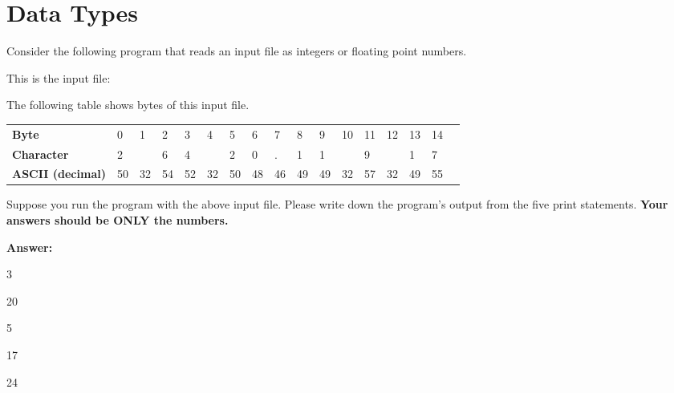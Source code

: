 \newpage
\section{Data Types}

Consider the following program that reads an input file as integers
or floating point numbers.

\resetlinenumber[1]
\linenumbers
\begin{tt}
  
\end{tt}
\nolinenumbers

This is the input file:

\begin{tt}
  
\end{tt}

The following table shows bytes of this input file.

\begin{table}[h]
\begin{tabular}{|l|l|l|l|l|l| l|l|l|l|l| l|l|l|l|l| l|} \hline
{\bf Byte}            & 0 & 1 & 2 & 3 & 4 & 5 & 6 & 7 & 8 & 9 & 10 & 11 & 12
& 13 & 14 \\

{\bf Character}       & 2 &   & 6 & 4 &   & 2 & 0 & . & 1 & 1 & & 9 & & 1 & 7 \\

{\bf ASCII (decimal)} & 50 & 32 & 54 & 52 & 32 & 50 & 48 &
46 & 49 & 49 & 32 & 57 & 32 & 49 & 55  \\ \hline
\end{tabular}
\end{table}

\vspace{0.2in}

Suppose you run the program with the above input file. Please write down the program's output from the five print statements.
{\bf Your answers should be ONLY the numbers.}

\ifexam


\else


{\bf Answer:}

3

20

5

17

24

\fi

